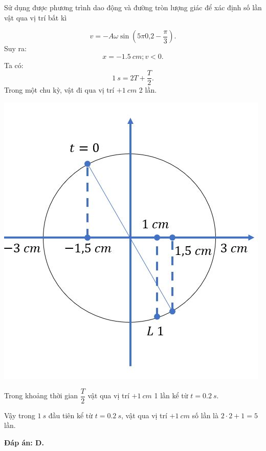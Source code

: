 \begin{dang}{Sử dụng được phương trình dao động và đường tròn lượng giác để xác định số lần vật qua vị trí bất kì}
{		\begin{equation*}
			v= - A\omega \sin \left(5\pi \text{0,2}-\dfrac{\pi}{3}\right).
		\end{equation*}
		Suy ra:
		\begin{equation*}
			x= -\SI{1,5}{cm}; v<0.
		\end{equation*}
		Ta có: 
		\begin{equation*}
			\SI{1}{s} = 2T+\dfrac{T}{2}.
		\end{equation*}
		Trong một chu kỳ, vật đi qua vị trí $+\SI{1}{cm}$ 2 lần.
		\begin{center}
			\includegraphics[scale=0.6]{../figs/VN12-PH-02-A-001-4-V2-8.jpg}
		\end{center}
		Trong khoảng thời gian $\dfrac{T}{2}$ vật qua vị trí $+ \SI{1}{cm}$ 1 lần kể từ $t=\SI{0,2}{s}$.
		
		Vậy trong $\SI{1}{s}$ đầu tiên kể từ $t =\SI{0,2}{s}$, vật qua vị trí $+ \SI{1}{cm}$ số lần là $2 \cdot 2 + 1 = 5$ lần.
		
		\textbf{Đáp án: D.}
	}
\end{dang}